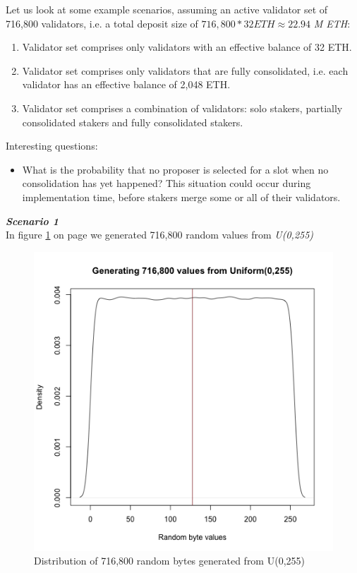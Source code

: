 Let us look at some example scenarios, assuming an active validator set of 716,800 validators, i.e. a total deposit size of $716,800 * 32 ETH \approx 22.94$ \textit{M ETH}:
\begin{enumerate}
\item Validator set comprises only validators with an effective balance of 32 ETH.
\item Validator set comprises only validators that are fully consolidated, i.e. each validator has an effective balance of 2,048 ETH.
\item Validator set comprises a combination of validators: solo stakers, partially consolidated stakers and fully consolidated stakers.
\end{enumerate}

Interesting questions:
\begin{itemize}
\item What is the probability that no proposer is selected for a slot when no consolidation has yet happened? This situation could occur during implementation time, before stakers merge some or all of their validators.
\end{itemize}


\noindent
\textbf{\textit{Scenario 1}} \\
\noindent
In figure \ref{fig:random} on page \pageref{fig:random} we generated 716,800 random values from \textit{U(0,255)} \\

\begin{figure}[htbp]
\begin{center}
\includegraphics[width=0.5\linewidth]{images/validator-indices-density}
\caption{Distribution of 716,800 random bytes generated from U(0,255)}
\label{fig:random}
\end{center}
\end{figure}


